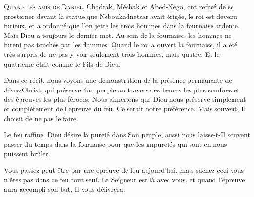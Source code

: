 \dvrule






\lettrine{Q}{uand les amis de Daniel,} Chadrak, Méchak et Abed-Nego,
 ont refusé de se prosterner devant la statue que Neboukadnetsar avait érigée,
 le roi est devenu furieux, et a ordonné que l'on jette les trois hommes
 dans la fournaise ardente. Mais Dieu a toujours le dernier mot.
 Au sein de la fournaise, les hommes ne furent pas touchés par les flammes.
 Quand le roi a ouvert la fournaise, il a été très surpris de ne pas y voir
 seulement trois hommes, mais quatre.
 Et le quatrième était comme \og le Fils de Dieu. \fg{}

Dans ce récit, nous voyons une démonstration de la présence permanente
 de Jésus-Christ, qui préserve Son peuple au travers des heures
 les plus sombres et des  épreuves les plus féroces.
 Nous aimerions que Dieu nous préserve simplement et complètement
 de l'épreuve du feu. Ce serait notre préférence.
 Mais souvent, Il choisit de ne pas le faire. 


Le feu raffine. Dieu désire la pureté dans Son peuple,
 aussi nous laisse-t-Il souvent passer du temps dans la fournaise
 pour que les impuretés qui sont en nous puissent brûler. 

Vous passez peut-être par une épreuve de feu aujourd'hui, mais sachez ceci
 \ocadr vous n'êtes pas dans ce feu tout seul.
 Le Seigneur est là avec vous, et quand l'épreuve aura accompli son but,
 Il vous délivrera. 

\dvrule



